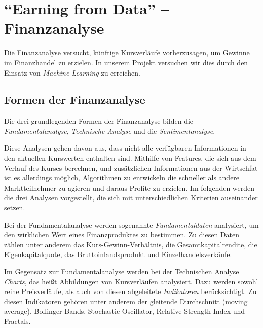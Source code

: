 \section{\enquote{Earning from Data} -- Finanzanalyse}
\label{sec:FinanzenIntro}

Die Finanzanalyse versucht, künftige Kursverläufe vorherzusagen, um Gewinne im Finanzhandel zu erzielen. In unserem Projekt versuchen wir dies durch den Einsatz von \emph{Machine Learning} zu erreichen.

\subsection{Formen der Finanzanalyse}
\label{ssec:FinanzanalyseFormenIntro}

Die drei grundlegenden Formen der Finanzanalyse bilden die \emph{Fundamentalanalyse}, \emph{Technische Analyse} und die \emph{Sentimentanalyse}. 

Diese Analysen gehen davon aus, dass nicht alle verfügbaren Informationen in den aktuellen Kurswerten enthalten sind. Mithilfe von Features, die sich aus dem Verlauf des Kurses berechnen, und zus\"atzlichen Informationen aus der Wirtschfat ist es allerdings möglich, Algorithmen zu entwickeln die schneller als andere Marktteilnehmer zu agieren und daraus Profite zu erzielen. Im folgenden werden die drei Analysen vorgestellt, die sich mit unterschiedlichen Kriterien auseinander setzen.  


Bei der Fundamentalanalyse werden sogenannte \emph{Fundamentaldaten} analysiert, um den wirklichen Wert eines Finanzproduktes zu bestimmen. Zu diesen Daten zählen unter anderem das Kurs-Gewinn-Verhältnis, die Gesamtkapitalrendite, die Eigenkapitalquote, das Bruttoinlandsprodukt und Einzelhandelsverkäufe.

Im Gegensatz zur Fundamentalanalyse werden bei der Technischen Analyse \emph{Charts}, das heißt Abbildungen von Kursverläufen analysiert. Dazu werden sowohl reine Preisverläufe, als auch von diesen abgeleitete \emph{Indikatoren} berücksichtigt. Zu diesen Indikatoren gehören unter anderem der gleitende Durchschnitt (moving average), Bollinger Bands, Stochastic Oscillator, Relative Strength Index und Fractals.

